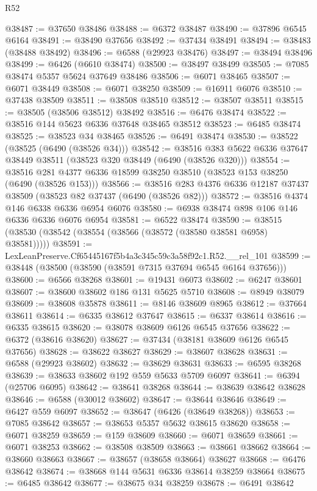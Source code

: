 \begin{lexlean}{R52}
\begin{coremodule}
@38487 := @37650 @38486
@38488 := @6372 @38487
@38490 := @37896 @6545 @6164
@38491 := @38490 @37656
@38492 := @37434 @38491
@38494 := @38483 (@38488 @38492)
@38496 := @6588 (@29923 @38476)
@38497 := @38494 @38496
@38499 := @6426 (@6610 @38474)
@38500 := @38497 @38499
@38505 := @7085 @38474 @5357 @5624 @37649 @38486
@38506 := @6071 @38465
@38507 := @6071 @38449
@38508 := @6071 @38250
@38509 := @16911 @6076
@38510 := @37438 @38509
@38511 := @38508 @38510
@38512 := @38507 @38511
@38515 := @38505 (@38506 @38512) @38492
@38516 := @6476 @38474
@38522 := @38516 @144 @5623 @6336 @37648 @38465 @38512
@38523 := @6485 @38474
@38525 := @38523 @34 @38465
@38526 := @6491 @38474
@38530 := @38522 (@38525 (@6490 (@38526 @34)))
@38542 := @38516 @383 @5622 @6336 @37647 @38449 @38511 (@38523 @320 @38449 (@6490 (@38526 @320)))
@38554 := @38516 @281 @4377 @6336 @18599 @38250 @38510 (@38523 @153 @38250 (@6490 (@38526 @153)))
@38566 := @38516 @283 @4376 @6336 @12187 @37437 @38509 (@38523 @82 @37437 (@6490 (@38526 @82)))
@38572 := @38516 @4374 @146 @6338 @6336 @6954 @6076
@38580 := @6938 @38474 @898 @106 @146 @6336 @6336 @6076 @6954
@38581 := @6522 @38474
@38590 := @38515 (@38530 (@38542 (@38554 (@38566 (@38572 (@38580 @38581 @6958) @38581)))))
@38591 := LexLeanPreserve.Cf65445167f5b4a3c345c59c3a58f92c1.R52.__rel_101
@38599 := @38448 (@38500 (@38590 (@38591 @7315 @37694 @6545 @6164 @37656)))
@38600 := @6566 @38268
@38601 := @19431 @6073
@38602 := @6247 @38601
@38607 := @38600 @38602 @186 @131 @5625 @5710
@38608 := @8949 @38079
@38609 := @38608 @35878
@38611 := @8146 @38609 @8965
@38612 := @37664 @38611
@38614 := @6335 @38612 @37647
@38615 := @6337 @38614
@38616 := @6335 @38615
@38620 := @38078 @38609 @6126 @6545 @37656
@38622 := @6372 (@38616 @38620)
@38627 := @37434 (@38181 @38609 @6126 @6545 @37656)
@38628 := @38622 @38627
@38629 := @38607 @38628
@38631 := @6588 (@29923 @38602)
@38632 := @38629 @38631
@38633 := @6595 @38268
@38639 := @38633 @38602 @192 @559 @5633 @5709 @6097
@38641 := @6394 (@25706 @6095)
@38642 := @38641 @38268
@38644 := @38639 @38642 @38628
@38646 := @6588 (@30012 @38602)
@38647 := @38644 @38646
@38649 := @6427 @559 @6097
@38652 := @38647 (@6426 (@38649 @38268))
@38653 := @7085 @38642
@38657 := @38653 @5357 @5632 @38615 @38620
@38658 := @6071 @38259
@38659 := @159 @38609
@38660 := @6071 @38659
@38661 := @6071 @38253
@38662 := @38508 @38509
@38663 := @38661 @38662
@38664 := @38660 @38663
@38667 := @38657 (@38658 @38664) @38627
@38668 := @6476 @38642
@38674 := @38668 @144 @5631 @6336 @38614 @38259 @38664
@38675 := @6485 @38642
@38677 := @38675 @34 @38259
@38678 := @6491 @38642

\end{coremodule}
\end{lexlean}
